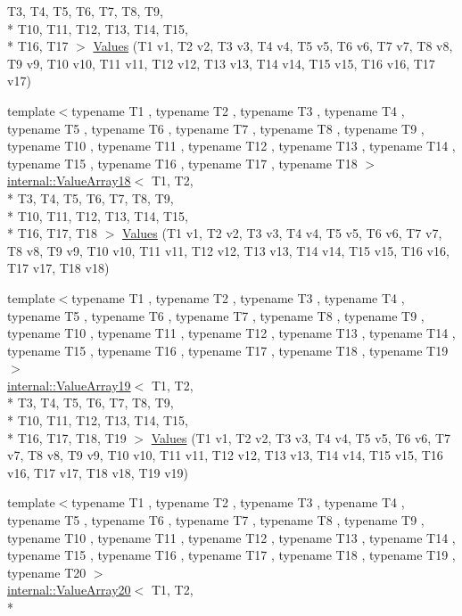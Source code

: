 \begin{DoxyCompactItemize}
T3, T4, T5, T6, T7, T8, T9, \\*
T10, T11, T12, T13, T14, T15, \\*
T16, T17 $>$ \hyperlink{namespacetesting_a5cb89ee5c491cbe65de523f9f1bc1987}{Values} (T1 v1, T2 v2, T3 v3, T4 v4, T5 v5, T6 v6, T7 v7, T8 v8, T9 v9, T10 v10, T11 v11, T12 v12, T13 v13, T14 v14, T15 v15, T16 v16, T17 v17)
\item 
{\footnotesize template$<$typename T1 , typename T2 , typename T3 , typename T4 , typename T5 , typename T6 , typename T7 , typename T8 , typename T9 , typename T10 , typename T11 , typename T12 , typename T13 , typename T14 , typename T15 , typename T16 , typename T17 , typename T18 $>$ }\\\hyperlink{classtesting_1_1internal_1_1ValueArray18}{internal\-::\-Value\-Array18}$<$ T1, T2, \\*
T3, T4, T5, T6, T7, T8, T9, \\*
T10, T11, T12, T13, T14, T15, \\*
T16, T17, T18 $>$ \hyperlink{namespacetesting_ab442a00c98b4bfb3bfa81f5e06bf53f9}{Values} (T1 v1, T2 v2, T3 v3, T4 v4, T5 v5, T6 v6, T7 v7, T8 v8, T9 v9, T10 v10, T11 v11, T12 v12, T13 v13, T14 v14, T15 v15, T16 v16, T17 v17, T18 v18)
\item 
{\footnotesize template$<$typename T1 , typename T2 , typename T3 , typename T4 , typename T5 , typename T6 , typename T7 , typename T8 , typename T9 , typename T10 , typename T11 , typename T12 , typename T13 , typename T14 , typename T15 , typename T16 , typename T17 , typename T18 , typename T19 $>$ }\\\hyperlink{classtesting_1_1internal_1_1ValueArray19}{internal\-::\-Value\-Array19}$<$ T1, T2, \\*
T3, T4, T5, T6, T7, T8, T9, \\*
T10, T11, T12, T13, T14, T15, \\*
T16, T17, T18, T19 $>$ \hyperlink{namespacetesting_a673757dbfc048bbb48e459485b30b2bf}{Values} (T1 v1, T2 v2, T3 v3, T4 v4, T5 v5, T6 v6, T7 v7, T8 v8, T9 v9, T10 v10, T11 v11, T12 v12, T13 v13, T14 v14, T15 v15, T16 v16, T17 v17, T18 v18, T19 v19)
\item 
{\footnotesize template$<$typename T1 , typename T2 , typename T3 , typename T4 , typename T5 , typename T6 , typename T7 , typename T8 , typename T9 , typename T10 , typename T11 , typename T12 , typename T13 , typename T14 , typename T15 , typename T16 , typename T17 , typename T18 , typename T19 , typename T20 $>$ }\\\hyperlink{classtesting_1_1internal_1_1ValueArray20}{internal\-::\-Value\-Array20}$<$ T1, T2, \\*

\end{DoxyCompactItemize}
